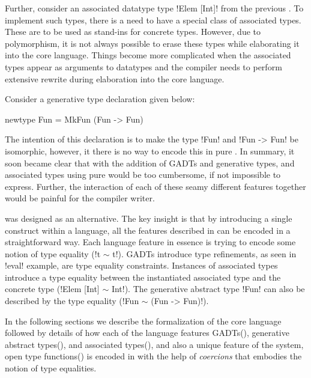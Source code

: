 \documentclass[manuscript,screen,nonacm]{acmart}
\begin{document}
Further, consider an associated datatype type !Elem [Int]! from the previous . To implement such types, there is a need to have a special class of associated types. These are to be used as stand-ins for concrete types. However, due to polymorphism, it is not always possible to erase these types while elaborating it into the core language. Things become more complicated when the associated types appear as arguments to datatypes and the compiler needs to perform extensive rewrite during elaboration into the core language.

Consider a generative type declaration given below:

\begin{CenteredBox}
\begin{code}
newtype Fun = MkFun (Fun -> Fun)
\end{code}
\end{CenteredBox}
The intention of this declaration is to make the type !Fun! and !Fun -> Fun! be isomorphic, however, it there is no way to encode this in pure \SF. In summary, it soon became clear that with the addition of GADTs and generative types, and associated types using pure \SF would be too cumbersome, if not impossible to express. Further, the interaction of each of these seamy different features together would be painful for the compiler writer.

\SFC\cite{sulzmann_system_2007} was designed as an alternative. The key insight is that by introducing a single construct within a language, all the features described in  can be encoded in a straightforward way. Each language feature in essence is trying to encode some notion of type equality (!t $\sim$ t!). GADTs introduce type refinements, as seen in !eval! example, are type equality constraints. Instances of associated types introduce a type equality between the instantiated associated type and the concrete type (!Elem [Int] $\sim$ Int!). The generative abstract type !Fun! can also be described by the type equality (!Fun $\sim$ (Fun -> Fun)!).

In the following sections we describe the formalization of the core language followed by details of how each of the language features GADTs(), generative abstract types(), and associated types(), and also a unique feature of the system, open type functions() is encoded in \SFC with the help of \emph{coercions} that embodies the notion of type equalities.
\end{document}

